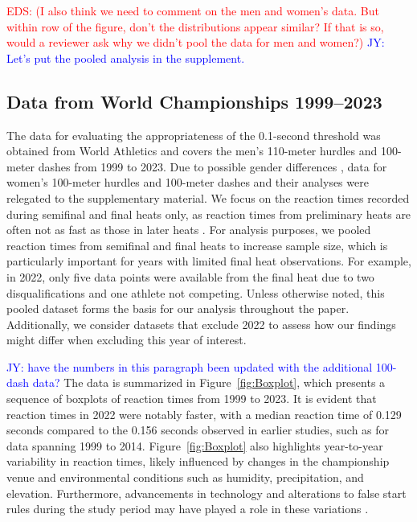 \documentclass[12pt, letterpaper]{article}
\newcommand{\jy}[1]{\textcolor{blue}{JY: #1}}
\newcommand{\eds}[1]{\textcolor{red}{EDS: (#1)}}
\begin{document}
\eds{I also think we need to comment on the men and women's data. But within row
of the figure, don't the distributions appear similar?  If that is so, would a 
reviewer ask why we didn't pool the data for men and women?}
\jy{Let's put the pooled analysis in the supplement.}

\subsection{Data from World Championships 1999--2023}
\label{sec:dataworld}

The data for evaluating the appropriateness of the 0.1-second
threshold was obtained from World Athletics and covers the men's
110-meter hurdles and 100-meter dashes from 1999 to 2023. Due to
possible gender differences \citep{babicc2009reaction,
  lipps2011implications}, data for women's 100-meter hurdles and
100-meter dashes and their analyses were relegated to the
supplementary material. We focus on the reaction times recorded during
semifinal and final heats only, as reaction times from preliminary
heats are often not as fast as those in later heats
\citep[e.g.,][]{collet1999strategic, tonnessen2013reaction,
  brosnan2017effects, zhang2021correlation}. For analysis purposes, we
pooled reaction times from semifinal and final heats to increase sample 
size, which is particularly important for years with limited final heat 
observations. For example, in 2022, only five data points were available 
from the final heat due to two disqualifications and one athlete not 
competing. Unless otherwise noted, this pooled dataset forms the basis 
for our analysis throughout the paper. Additionally, we consider datasets 
that exclude 2022 to assess how our findings might differ when excluding 
this year of interest.


\jy{have the numbers in this paragraph been updated with the
  additional 100-dash data?}
The data is summarized in Figure~\ref{fig:Boxplot}, which presents a
sequence of boxplots of reaction times from 1999 to 2023. It is evident 
that reaction times in 2022 were notably faster, with a median reaction 
time of 0.129 seconds compared to the 0.156 seconds observed in earlier 
studies, such as \citet{brosnan2017effects} for data spanning 1999 to 2014. 
Figure~\ref{fig:Boxplot} also highlights year-to-year variability in 
reaction times, likely influenced by changes in the championship venue 
and environmental conditions such as humidity, precipitation, and 
elevation. Furthermore, advancements in technology and alterations to 
false start rules during the study period may have played a role in these 
variations \citep{willwacher2013novel}.
\end{document}
